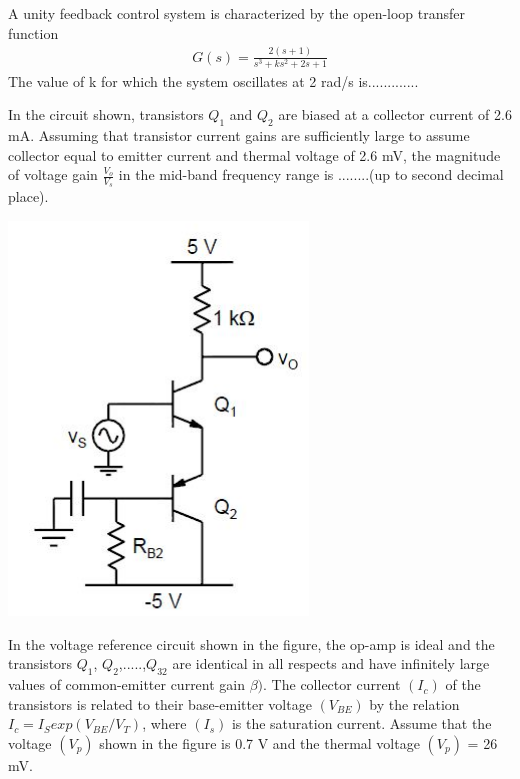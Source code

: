 \item A unity feedback control system is characterized by the open-loop transfer function 
\begin{align*}
G(s) = \frac{2(s + 1)}{s^3 + ks^2 + 2s + 1}
\end{align*}
The value of k for which the system oscillates at 2 rad/s is.............

\item In the circuit shown, transistors $Q_1$ and $Q_2$ are biased at a collector current of 2.6 mA. Assuming that transistor current gains are sufficiently large to assume collector equal to emitter current and thermal voltage of 2.6 mV, the magnitude of voltage gain $\frac{V_o}{V_s}$ in the mid-band frequency range is ........(up to second decimal place).

\includegraphics[scale=0.4]{42}

\item In the voltage reference circuit shown in the figure, the op-amp is ideal and the transistors $Q_{1}$, $Q_{2}$,.....,$Q_{32}$ are identical in all respects and have infinitely large values of common-emitter current gain $\beta)$. The collector current $(I_{c})$ of the transistors is related to their base-emitter voltage $(V_{BE})$ by the relation $I_{c} = I_{S} exp(V_{BE}/V_{T})$, where $(I_{s})$ is the saturation current. Assume that the voltage $(V_{p})$ shown in the figure is 0.7 V and the thermal voltage $(V_{p})$ = 26 mV.

